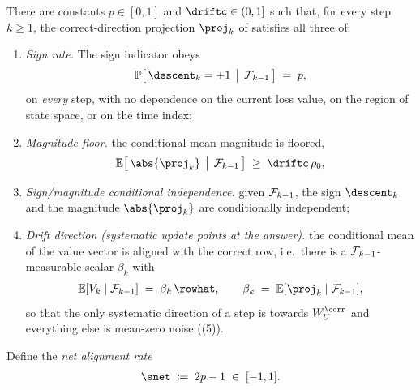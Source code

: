 \begin{assumption}
\label{ass:descent}
There are constants $p\in[0,1]$ and $\driftc\in(0,1]$ such that, for every
step $k\ge1$, the correct-direction projection $\proj_k$ of
 satisfies all three of:
\begin{enumerate}[label=(\alph*),leftmargin=2em,itemsep=0.2em]
\item \emph{Sign rate.} The sign indicator obeys
       \begin{align}\label{eq:descent_condition}
          \Pr\bigl[\, \descent_k = +1 \,\bigm|\, \Fcal_{k-1} \,\bigr] \;=\; p,
       \end{align}
       on \emph{every} step, with no dependence on the current loss value,
       on the region of state space, or on the time index;
\item \emph{Magnitude floor.} the conditional mean magnitude is floored,
       \begin{align}\label{eq:magnitude_floor}
          \E\bigl[\, \abs{\proj_k} \,\bigm|\, \Fcal_{k-1} \,\bigr]
          \;\ge\; \driftc\,\rho_0,
       \end{align}
\item \emph{Sign/magnitude conditional independence.} given $\mathcal{F}_{k-1}$,
       the sign $\descent_k$ and the magnitude $\abs{\proj_k}$ are
       conditionally independent;
\item \emph{Drift direction (systematic update points at the answer).} the
       conditional mean of the value vector is aligned with the correct
       row, i.e.\ there is a $\mathcal{F}_{k-1}$-measurable scalar $\beta_k$ with
       \begin{align}\label{eq:drift_direction}
          \E[V_k\mid\Fcal_{k-1}] \;=\; \beta_k\,\rowhat,
          \qquad
          \beta_k \;=\; \E[\proj_k\mid\Fcal_{k-1}],
       \end{align}
       so that the only systematic direction of a step is towards
       $W_U^{\corr}$ and everything else is mean-zero noise
       ((5)).
\end{enumerate}
Define the \emph{net alignment rate}
\begin{align}\label{eq:delta_def}
   \snet \;\coloneqq\; 2p - 1 \;\in\; [-1, 1].
\end{align}
\end{assumption}


